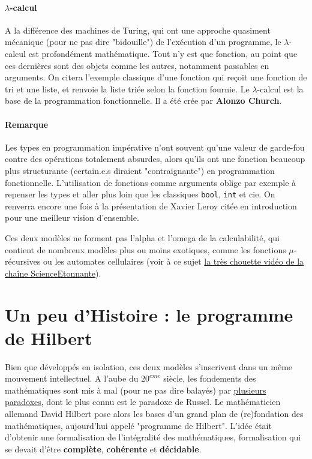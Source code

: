 \paragraph{$\lambda$-calcul} A la différence des machines de Turing, qui ont une approche quasiment mécanique (pour ne pas dire "bidouille") de l'exécution d'un programme, le $\lambda$-calcul est profondément mathématique. Tout n'y est que fonction, au point que ces dernières sont des objets comme les autres, notamment passables en arguments. On citera l'exemple classique d'une fonction qui reçoit une fonction de tri et une liste, et renvoie la liste triée selon la fonction fournie. Le $\lambda$-calcul est la base de la programmation fonctionnelle. Il a été crée par \textbf{Alonzo Church}.

\paragraph{Remarque} Les types en programmation impérative n'ont souvent qu'une valeur de garde-fou contre des opérations totalement absurdes, alors qu'ils ont une fonction beaucoup plus structurante (certain.e.s diraient "contraignante") en programmation fonctionnelle. L'utilisation de fonctions comme arguments oblige par exemple à repenser les types et aller plus loin que les classiques \verb!bool!, \verb!int! et cie. On renverra encore une fois à la présentation de Xavier Leroy citée en introduction pour une meilleur vision d'ensemble.

Ces deux modèles ne forment pas l'alpha et l'omega de la calculabilité, qui contient de nombreux modèles plus ou moins exotiques, comme les fonctions $\mu$-récursives ou les automates cellulaires (voir à ce sujet \href{https://www.youtube.com/watch?v=S-W0NX97DB0}{la très chouette vidéo de la chaîne ScienceEtonnante}).

\section{Un peu d'Histoire : le programme de Hilbert} 

Bien que développés en isolation, ces deux modèles s'inscrivent dans un même mouvement intellectuel. A l'aube du $20^{eme}$ siècle, les fondements des mathématiques sont mis à mal (pour ne pas dire balayés) par \href{https://en.wikipedia.org/wiki/Foundations_of_mathematics#Foundational_crisis}{plusieurs paradoxes}, dont le plus connu est le paradoxe de Russel. Le mathématicien allemand David Hilbert pose alors les bases d'un grand plan de (re)fondation des mathématiques, aujourd'hui appelé "programme de Hilbert". L'idée était d'obtenir une formalisation de l'intégralité des mathématiques, formalisation qui se devait d'être \textbf{complète}, \textbf{cohérente} et \textbf{décidable}.

